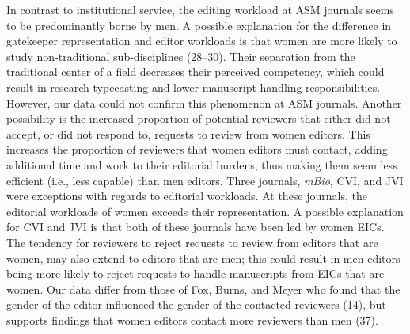 \documentclass[11pt,]{article}
\begin{document}
In contrast to institutional service, the editing workload at ASM
journals seems to be predominantly borne by men. A possible explanation
for the difference in gatekeeper representation and editor workloads is
that women are more likely to study non-traditional sub-disciplines
(28--30). Their separation from the traditional center of a field
decreases their perceived competency, which could result in research
typecasting and lower manuscript handling responsibilities. However, our
data could not confirm this phenomenon at ASM journals. Another
possibility is the increased proportion of potential reviewers that
either did not accept, or did not respond to, requests to review from
women editors. This increases the proportion of reviewers that women
editors must contact, adding additional time and work to their editorial
burdens, thus making them seem less efficient (i.e., less capable) than
men editors. Three journals, \emph{mBio}, CVI, and JVI were exceptions
with regards to editorial workloads. At these journals, the editorial
workloads of women exceeds their representation. A possible explanation
for CVI and JVI is that both of these journals have been led by women
EICs. The tendency for reviewers to reject requests to review from
editors that are women, may also extend to editors that are men; this
could result in men editors being more likely to reject requests to
handle manuscripts from EICs that are women. Our data differ from those
of Fox, Burns, and Meyer who found that the gender of the editor
influenced the gender of the contacted reviewers (14), but supports
findings that women editors contact more reviewers than men (37).
\end{document}
